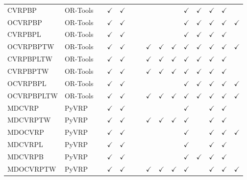\documentclass{article}
\theoremstyle{plain}
\theoremstyle{definition}
\theoremstyle{remark}
\begin{document}
\begin{table}[h!]
{\begin{tabular}{l|l|cc|cccccc|ccccc}
    CVRPBP&OR-Tools     & & $\checkmark$ & $\checkmark$ & & & & & & $\checkmark$ & $\checkmark$ & $\checkmark$ & $\checkmark$ & \\
    OCVRPBP&OR-Tools    & & $\checkmark$ & $\checkmark$ & & & & & & $\checkmark$ & $\checkmark$ & $\checkmark$ & $\checkmark$ & $\checkmark$ \\
    CVRPBPL&OR-Tools    & & $\checkmark$ & $\checkmark$ & & & & & & $\checkmark$ & $\checkmark$ & $\checkmark$ & $\checkmark$ & \\
    OCVRPBPTW&OR-Tools  & & $\checkmark$ & $\checkmark$ & & & $\checkmark$ & $\checkmark$ & $\checkmark$ & $\checkmark$ & $\checkmark$ & $\checkmark$ & $\checkmark$ & $\checkmark$ \\
    CVRPBPLTW&OR-Tools   & & $\checkmark$ & $\checkmark$ & & & $\checkmark$ & $\checkmark$ & $\checkmark$ & $\checkmark$ & $\checkmark$ & $\checkmark$ & $\checkmark$ & \\
    CVRPBPTW&OR-Tools   & & $\checkmark$ & $\checkmark$ & & & $\checkmark$ & $\checkmark$ & $\checkmark$ & $\checkmark$ & $\checkmark$ & $\checkmark$ & $\checkmark$ & \\
    OCVRPBPL&OR-Tools   & & $\checkmark$ & $\checkmark$ & & & & & & $\checkmark$ & $\checkmark$ & $\checkmark$ & $\checkmark$ & $\checkmark$ \\
    OCVRPBPLTW&OR-Tools  & & $\checkmark$ & $\checkmark$ & & & $\checkmark$ & $\checkmark$ & $\checkmark$ & $\checkmark$ & $\checkmark$ & $\checkmark$ & $\checkmark$ & $\checkmark$ \\
    \midrule
    MDCVRP &PyVRP      & & $\checkmark$ & $\checkmark$ & & & & & & $\checkmark$ & & $\checkmark$ & $\checkmark$ & \\
    MDCVRPTW &PyVRP    & & $\checkmark$ & $\checkmark$ & & & $\checkmark$ & $\checkmark$ & $\checkmark$ & $\checkmark$ & & $\checkmark$ & $\checkmark$ & \\
    MDOCVRP &PyVRP     & & $\checkmark$ & $\checkmark$ & & & & & & $\checkmark$ & & $\checkmark$ & $\checkmark$ & $\checkmark$ \\
    MDCVRPL &PyVRP     & & $\checkmark$ & $\checkmark$ & & & & & & $\checkmark$ & & $\checkmark$ & $\checkmark$ & \\
    MDCVRPB &PyVRP     & & $\checkmark$ & $\checkmark$ & & & & & & $\checkmark$ & $\checkmark$ & $\checkmark$ & $\checkmark$ & \\
    MDOCVRPTW &PyVRP   & & $\checkmark$ & $\checkmark$ & & & $\checkmark$ & $\checkmark$ & $\checkmark$ & $\checkmark$ & & $\checkmark$ & $\checkmark$ & $\checkmark$ \\

\end{tabular}}
\end{table}
\end{document}
